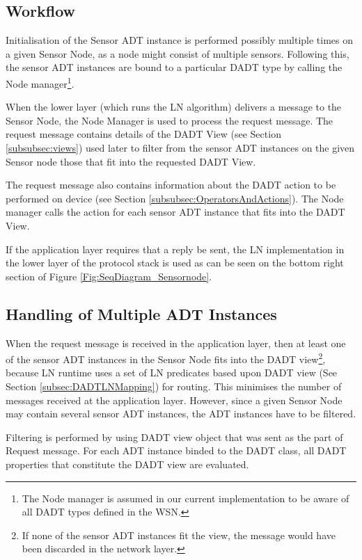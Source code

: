 \subsection{Workflow}

Initialisation of the Sensor ADT instance is performed possibly
multiple times on a given Sensor Node, as a node might consist of multiple sensors. Following
this, the sensor ADT instances are bound to a particular DADT type by calling
the Node manager\footnote{The Node manager is assumed in our
current implementation to be aware of all DADT types defined in the WSN.}.

When the lower layer (which runs the LN algorithm) delivers a message to the
Sensor Node, the Node Manager is used to process the request message. The
request message contains details of the DADT View (see Section
\ref{subsubsec:views}) used later to filter from the sensor ADT
instances on the given Sensor node those that fit into the requested DADT View. 

The request message also contains information about the DADT action to be
performed on device (see Section \ref{subsubsec:OperatorsAndActions}). 
The Node manager calls the action for each sensor ADT instance that fits into the DADT View. 

If the application layer requires that a reply be sent, the LN implementation in
the lower layer of the protocol stack is used as can be seen on the bottom
right section of Figure \ref{Fig:SeqDiagram_Sensornode}.

\subsection{Handling of Multiple ADT Instances}

When the request message is received in the application layer, then at least
one of the sensor ADT instances in the Sensor Node fits into the DADT view\footnote{If none of the sensor ADT instances fit the view, the message would have been discarded in the network
layer.}, because LN runtime uses a set of LN predicates based upon DADT view
(See Section \ref{subsec:DADTLNMapping}) for routing. 
This minimises the number of messages received at the application layer. However,
since a given Sensor Node may contain several sensor ADT instances, the ADT
instances have to be filtered.

Filtering is performed by using DADT view object that was sent as the part
of Request message. For each ADT instance binded to the DADT class, all DADT
properties that constitute the DADT view are evaluated. 

